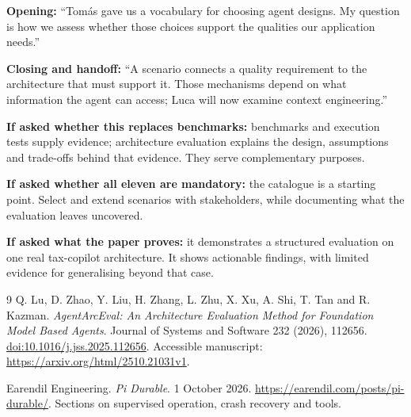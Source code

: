 \documentclass[11pt,a4paper]{article}
\begin{document}
\textbf{Opening:} ``Tom\'as gave us a vocabulary for choosing agent designs. My question is how we assess whether those choices support the qualities our application needs.''

\textbf{Closing and handoff:} ``A scenario connects a quality requirement to the architecture that must support it. Those mechanisms depend on what information the agent can access; Luca will now examine context engineering.''

\textbf{If asked whether this replaces benchmarks:} benchmarks and execution tests supply evidence; architecture evaluation explains the design, assumptions and trade-offs behind that evidence. They serve complementary purposes.

\textbf{If asked whether all eleven are mandatory:} the catalogue is a starting point. Select and extend scenarios with stakeholders, while documenting what the evaluation leaves uncovered.

\textbf{If asked what the paper proves:} it demonstrates a structured evaluation on one real tax-copilot architecture. It shows actionable findings, with limited evidence for generalising beyond that case.

\begin{thebibliography}{9}
Q. Lu, D. Zhao, Y. Liu, H. Zhang, L. Zhu, X. Xu, A. Shi, T. Tan and R. Kazman.
\emph{AgentArcEval: An Architecture Evaluation Method for Foundation Model Based Agents}.
Journal of Systems and Software 232 (2026), 112656.
\href{https://doi.org/10.1016/j.jss.2025.112656}{doi:10.1016/j.jss.2025.112656}.
Accessible manuscript: \url{https://arxiv.org/html/2510.21031v1}.

Earendil Engineering. \emph{Pi Durable}. 1 October 2026.
\url{https://earendil.com/posts/pi-durable/}.
Sections on supervised operation, crash recovery and tools.
\end{thebibliography}
\end{document}

